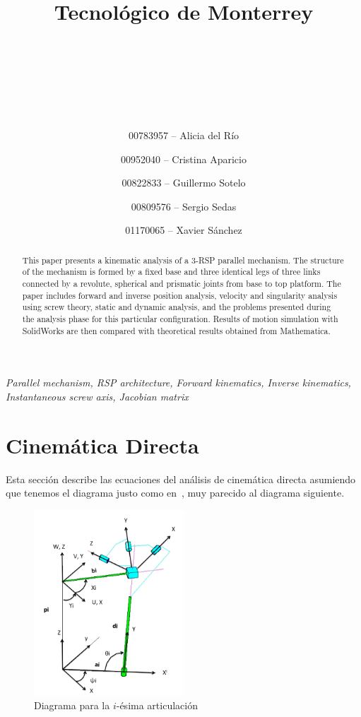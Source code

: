 \documentclass[titlepage, letterpaper, fleqn]{article}
\title{
\vspace{1in}
\textbf{Tecnológico de Monterrey} \\
\vspace{0.5in}
\textmd{\mahclass} \\
\large{\textit{\mahteacher}} \\
\vspace{0.5in}
\textsc{\mahtitle}\\
\author{00783957 -- Alicia del Río \\
\and 00952040 -- Cristina Aparicio \\
\and 00822833 -- Guillermo Sotelo \\
\and 00809576 -- Sergio Sedas \\
\and 01170065 -- Xavier Sánchez}
\date{\mahdate}
}
\newcommand{\spacepls}{\vspace{5mm}}
\begin{document}
\begin{titlepage}
\maketitle
\end{titlepage}

%
%

\begin{abstract}
This paper presents a kinematic analysis of a 3-RSP parallel mechanism.
The structure of the mechanism is formed by a fixed base and three identical legs of three links connected by a revolute, spherical and prismatic joints from base to top platform.
The paper includes forward and inverse position analysis, velocity and singularity analysis using screw theory, static and dynamic analysis, and the problems presented during the analysis phase for this particular configuration.
Results of motion simulation with SolidWorks are then compared with theoretical results obtained from Mathematica.
\end{abstract}

\spacepls
\textit{Parallel mechanism, RSP architecture, Forward kinematics, Inverse kinematics, Instantaneous screw axis, Jacobian matrix}
\spacepls

\section{Cinemática Directa} %
\label{sec:forward}

Esta sección describe las ecuaciones del análisis de cinemática directa asumiendo que tenemos el diagrama justo como en~\cite{Rodriguez-Leal2011}, muy parecido al diagrama siguiente.

\begin{figure}[htbp]
    \centering
    \includegraphics[width=0.5\textwidth]{02-diagram}
    \caption{Diagrama para la $i$-ésima articulación}
    \label{fig:label}
\end{figure}
\end{document}
